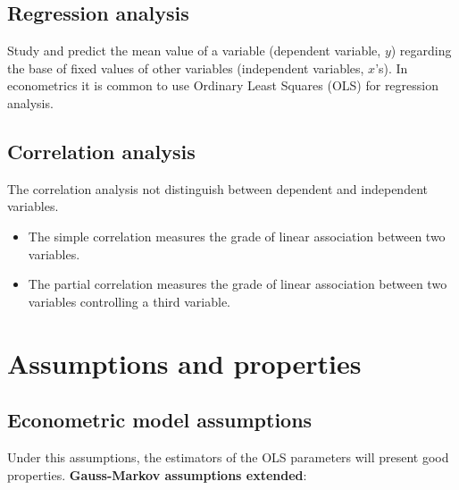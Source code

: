 \documentclass[10pt, a4paper, landscape]{extarticle}
\begin{document}
\begin{multicols}{3}
\subsection*{Regression analysis}
Study and predict the mean value of a variable (dependent variable, $y$) regarding the base of fixed values of other variables (independent variables, $x$'s). In econometrics it is common to use Ordinary Least Squares (OLS) for regression analysis.

\subsection*{Correlation analysis}
The correlation analysis not distinguish between dependent and independent variables.

\begin{itemize}[leftmargin=*]
\item The simple correlation measures the grade of linear association between two variables.
\item The partial correlation measures the grade of linear association between two variables controlling a third variable.
\end{itemize}

\columnbreak

\section*{Assumptions and properties}
\subsection*{Econometric model assumptions}

Under this assumptions, the estimators of the OLS parameters will present good properties. \textbf{Gauss-Markov assumptions extended}:


\end{multicols}
\end{document}
